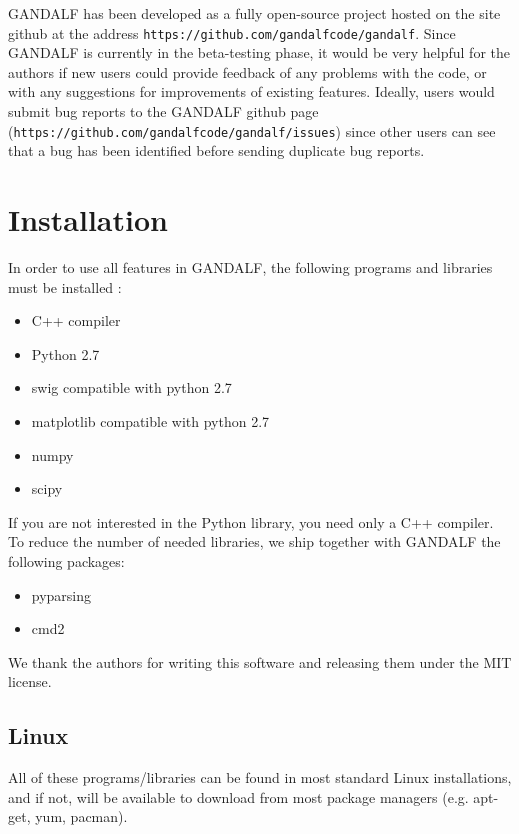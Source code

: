 \documentclass[a4paper]{article}
\newcommand{\var}[1]{\texttt{#1}}
\begin{document}
GANDALF has been developed as a fully open-source project hosted on the site github at the address \var{https://github.com/gandalfcode/gandalf}.  Since GANDALF is currently in the beta-testing phase, it would be very helpful for the authors if new users could provide feedback of any problems with the code, or with any suggestions for improvements of existing features.  Ideally, users would submit bug reports to the GANDALF github page (\var{https://github.com/gandalfcode/gandalf/issues}) since other users can see that a bug has been identified before sending duplicate bug reports.

\newpage


\section{Installation} \label{S:INSTALL}
In order to use all features in GANDALF, the following programs and libraries must be installed :
\begin{itemize}
\item C++ compiler
\item Python 2.7
\item swig compatible with python 2.7
\item matplotlib compatible with python 2.7
\item numpy
\item scipy
\end{itemize}

If you are not interested in the Python library, you need only a C++ compiler. To reduce the number of needed libraries, we ship together with GANDALF the following packages:
\begin{itemize}
\item pyparsing
\item cmd2
\end{itemize}
We thank the authors for writing this software and releasing them under the MIT license.


\subsection{Linux}
All of these programs/libraries can be found in most standard Linux installations, and if not, will be available to download from most package managers (e.g. apt-get, yum, pacman).
\end{document}
